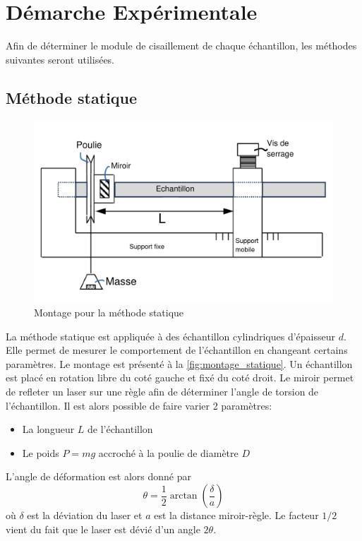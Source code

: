 \section{Démarche Expérimentale}

Afin de déterminer le module de cisaillement de chaque échantillon, les méthodes suivantes seront utilisées.

\subsection{Méthode statique}

\begin{figure}[h]
    \centering
    \includegraphics[width=0.6\linewidth]{figures/statique_annotated.png}
    \caption{Montage pour la méthode statique \cite{notice}}
    \label{fig:montage_statique}
\end{figure}

La méthode statique est appliquée à des échantillon cylindriques d'épaisseur $d$. Elle permet de mesurer le comportement de l'échantillon en changeant certains paramètres. Le montage est présenté à la \autoref{fig:montage_statique}. Un échantillon est placé en rotation libre du coté gauche et fixé du coté droit. Le miroir permet de refleter un laser sur une règle afin de déterminer l'angle de torsion de l'échantillon. Il est alors possible de faire varier 2 paramètres:
\begin{itemize}
    \item La longueur $L$ de l'échantillon
    \item Le poids $P=mg$ accroché à la poulie de diamètre $D$
\end{itemize}
L'angle de déformation est alors donné par
\begin{equation}
    \theta = \frac{1}{2}\arctan\left(\frac{\delta}{a}\right)
    \label{eq:angle_deformation}
\end{equation}
où $\delta$ est la déviation du laser et $a$ est la distance miroir-règle. Le facteur $1/2$ vient du fait  que le laser est dévié d'un angle $2\theta$.

